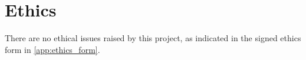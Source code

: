 \documentclass[../../main.tex]{subfiles}
\begin{document}
\section{Ethics}
There are no ethical issues raised by this project, as indicated in the signed ethics form in \cref{app:ethics_form}.
\end{document}
